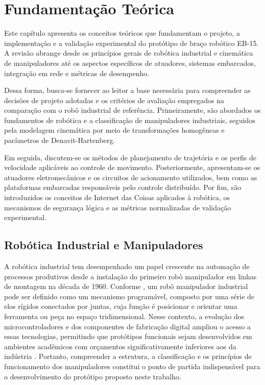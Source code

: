 \chapter{Fundamentação Teórica}

Este capítulo apresenta os conceitos teóricos que fundamentam o projeto, a implementação e a validação experimental do protótipo de braço robótico EB-15. A revisão abrange desde os princípios gerais de robótica industrial e cinemática de manipuladores até os aspectos específicos de atuadores, sistemas embarcados, integração em rede e métricas de desempenho.

Dessa forma, busca-se fornecer ao leitor a base necessária para compreender as decisões de projeto adotadas e os critérios de avaliação empregados na comparação com o robô industrial de referência. Primeiramente, são abordados os fundamentos de robótica e a classificação de manipuladores industriais, seguidos pela modelagem cinemática por meio de transformações homogêneas e parâmetros de Denavit-Hartenberg.

Em seguida, discutem-se os métodos de planejamento de trajetória e os perfis de velocidade aplicáveis ao controle de movimento. Posteriormente, apresentam-se os atuadores eletromecânicos e os circuitos de acionamento utilizados, bem como as plataformas embarcadas responsáveis pelo controle distribuído. Por fim, são introduzidos os conceitos de Internet das Coisas aplicados à robótica, os mecanismos de segurança lógica e as métricas normalizadas de validação experimental.

\section{Robótica Industrial e Manipuladores}

A robótica industrial tem desempenhado um papel crescente na automação de processos produtivos desde a instalação do primeiro robô manipulador em linhas de montagem na década de 1960. Conforme , um robô manipulador industrial pode ser definido como um mecanismo programável, composto por uma série de elos rígidos conectados por juntas, cuja função é posicionar e orientar uma ferramenta ou peça no espaço tridimensional. Nesse contexto, a evolução dos microcontroladores e dos componentes de fabricação digital ampliou o acesso a essas tecnologias, permitindo que protótipos funcionais sejam desenvolvidos em ambientes acadêmicos com orçamentos significativamente inferiores aos da indústria \cite{ramirez2022}. Portanto, compreender a estrutura, a classificação e os princípios de funcionamento dos manipuladores constitui o ponto de partida indispensável para o desenvolvimento do protótipo proposto neste trabalho.

